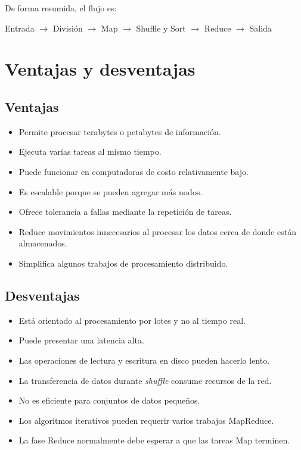 De forma resumida, el flujo es:

\begin{center}
Entrada $\longrightarrow$ División $\longrightarrow$ Map
$\longrightarrow$ Shuffle y Sort $\longrightarrow$ Reduce
$\longrightarrow$ Salida
\end{center}

\section{Ventajas y desventajas}

\subsection*{Ventajas}

\begin{itemize}
    \item Permite procesar terabytes o petabytes de información.
    \item Ejecuta varias tareas al mismo tiempo.
    \item Puede funcionar en computadoras de costo relativamente bajo.
    \item Es escalable porque se pueden agregar más nodos.
    \item Ofrece tolerancia a fallas mediante la repetición de tareas.
    \item Reduce movimientos innecesarios al procesar los datos cerca de donde
    están almacenados.
    \item Simplifica algunos trabajos de procesamiento distribuido.
\end{itemize}

\subsection*{Desventajas}

\begin{itemize}
    \item Está orientado al procesamiento por lotes y no al tiempo real.
    \item Puede presentar una latencia alta.
    \item Las operaciones de lectura y escritura en disco pueden hacerlo lento.
    \item La transferencia de datos durante \textit{shuffle} consume recursos
    de la red.
    \item No es eficiente para conjuntos de datos pequeños.
    \item Los algoritmos iterativos pueden requerir varios trabajos MapReduce.
    \item La fase Reduce normalmente debe esperar a que las tareas Map terminen.
\end{itemize}

